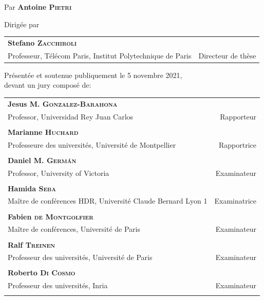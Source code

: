 \begin{titlingpage*}
\begin{SingleSpace}
\begin{center}
\begin{otherlanguage}{french}
\vspace{2mm}

{\LARGE Par } {\LARGE\textbf{Antoine \textsc{Pietri}}}\\

\vspace{5mm}

{\large Dirigée par }\\

\vspace{3mm}

\begin{tabular}{lr}
  \textbf{Stefano {\scshape Zacchiroli}} & \\
  Professeur, Télécom Paris, Institut Polytechnique de Paris
  \hspace{3.5mm}
  & Directeur de thèse \\
\end{tabular}

\vspace{4mm}

{\large Présentée et soutenue publiquement le 5 novembre 2021, \\
 devant un jury composé de:}\\

\vspace{4mm}

\begin{tabular}{lr}
  \textbf{Jesus M. {\scshape Gonzalez-Barahona}} & \\
  Professor, Universidad Rey Juan Carlos \hspace{45mm}
  & Rapporteur \\
  & \\
  \textbf{Marianne {\scshape Huchard}} & \\
  Professeure des universités, Université de Montpellier
  & Rapportrice \\
  & \\
  \textbf{Daniel M. {\scshape Germán}} & \\
  Professor, University of Victoria
  & Examinateur \\
  & \\
  \textbf{Hamida {\scshape Seba}} & \\
  Maître de conférences HDR, Université Claude Bernard Lyon 1
  & Examinatrice \\
  & \\
  \textbf{Fabien {\scshape de Montgolfier}} & \\
  Maître de conférences, Université de Paris
  & Examinateur \\
  & \\
  \textbf{Ralf {\scshape Treinen}} & \\
  Professeur des universités, Université de Paris
  & Examinateur \\
  & \\
  \textbf{Roberto {\scshape Di Cosmo}} & \\
  Professeur des universités, Inria
  & Examinateur \\
  & \\
\end{tabular}


\end{otherlanguage}
\end{center}
\end{SingleSpace}
\end{titlingpage*}
